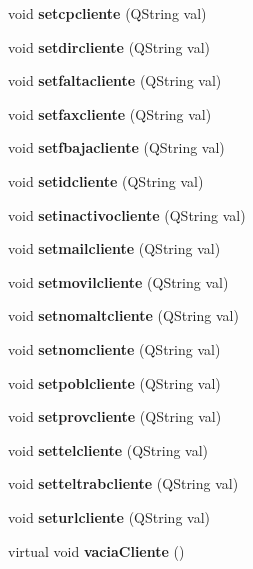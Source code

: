 \begin{CompactItemize}
\item 
void {\bf setcpcliente} (QString val)\label{classCliente_a32}

\item 
void {\bf setdircliente} (QString val)\label{classCliente_a33}

\item 
void {\bf setfaltacliente} (QString val)\label{classCliente_a34}

\item 
void {\bf setfaxcliente} (QString val)\label{classCliente_a35}

\item 
void {\bf setfbajacliente} (QString val)\label{classCliente_a36}

\item 
void {\bf setidcliente} (QString val)\label{classCliente_a37}

\item 
void {\bf setinactivocliente} (QString val)\label{classCliente_a38}

\item 
void {\bf setmailcliente} (QString val)\label{classCliente_a39}

\item 
void {\bf setmovilcliente} (QString val)\label{classCliente_a40}

\item 
void {\bf setnomaltcliente} (QString val)\label{classCliente_a41}

\item 
void {\bf setnomcliente} (QString val)\label{classCliente_a42}

\item 
void {\bf setpoblcliente} (QString val)\label{classCliente_a43}

\item 
void {\bf setprovcliente} (QString val)\label{classCliente_a44}

\item 
void {\bf settelcliente} (QString val)\label{classCliente_a45}

\item 
void {\bf setteltrabcliente} (QString val)\label{classCliente_a46}

\item 
void {\bf seturlcliente} (QString val)\label{classCliente_a47}

\item 
virtual void {\bf vacia\-Cliente} ()\label{classCliente_a48}

\end{CompactItemize}
